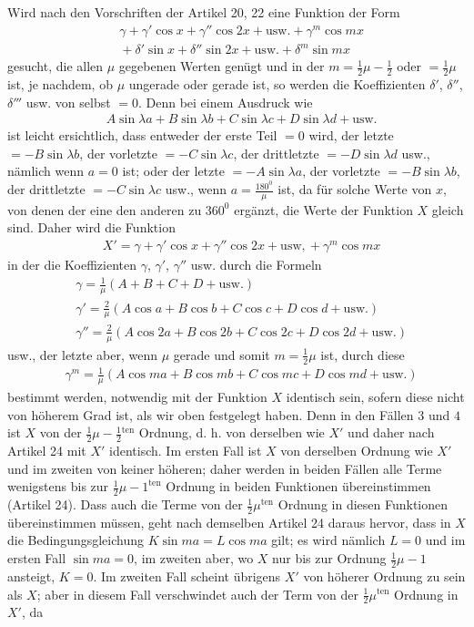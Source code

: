 Wird nach den Vorschriften der Artikel 20, 22 eine Funktion der Form
\[
\begin{aligned}
&\gamma+\gamma'\cos x+\gamma''\cos2x+\mathrm{usw.}+\gamma^m\cos mx\\[5pt]
&{}+\delta'\sin x+\delta''\sin2x+\mathrm{usw.}+\delta^m\sin mx
\end{aligned}
\]
gesucht, die allen $\mu$ gegebenen Werten genügt und in der $m=\frac12\mu-\frac12$ oder $=\frac12\mu$ ist, je nachdem, ob $\mu$ ungerade oder gerade ist, so werden die Koeffizienten $\delta'$, $\delta''$, $\delta'''$ usw. von selbst $=0$. Denn bei einem Ausdruck wie
\[
\begin{aligned}
&A\sin\lambda a+B\sin\lambda b+C\sin\lambda c+D\sin\lambda d+\mathrm{usw.}
\end{aligned}
\]
ist leicht ersichtlich, dass entweder der erste Teil $=0$ wird, der letzte $=-B\sin\lambda b$, der vorletzte $=-C\sin\lambda c$, der drittletzte $=-D\sin\lambda d$ usw., nämlich wenn $a=0$ ist; oder der letzte $=-A\sin\lambda a$, der vorletzte $=-B\sin\lambda b$, der drittletzte $=-C\sin\lambda c$ usw., wenn $a=\frac{180^{\mathord{0}}}{\mu}$ ist, da für solche Werte von $x$, von denen der eine den anderen zu $360^{\mathord{0}}$ ergänzt, die Werte der Funktion $X$ gleich sind. 
Daher wird die Funktion
\[
\begin{aligned}
&X'=\gamma+\gamma'\cos x+\gamma''\cos2x+\mathrm{usw,}+\gamma^m\cos mx
\end{aligned}
\]
in der die Koeffizienten $\gamma$, $\gamma'$, $\gamma''$ usw. durch die Formeln
\[
\begin{aligned}
&\gamma = \frac{1}{\mu}(A+B+C+D+\mathrm{usw.})\\[5pt]
&\gamma' = \frac{2}{\mu}(A\cos a+B\cos b+C\cos c+D\cos d+\mathrm{usw.})\\[5pt]
&\gamma'' = \frac{2}{\mu}(A\cos 2a+B\cos 2b+C\cos 2c+D\cos 2d+\mathrm{usw.})
\end{aligned}
\]
usw., der letzte aber, wenn $\mu$ gerade und somit $m=\frac12\mu$ ist, durch diese
\[
\begin{aligned}
&\gamma^m=\frac{1}{\mu}(A\cos ma+B\cos mb+C\cos mc+D\cos md+\mathrm{usw.})
\end{aligned}
\]
bestimmt werden, notwendig mit der Funktion $X$ identisch sein, sofern diese nicht von höherem Grad ist, als wir oben festgelegt haben. Denn in den Fällen $3$ und $4$ ist $X$ von der $\frac12\mu-\frac12{}^{\mathrm{ten}}$ Ordnung, d. h. von derselben wie $X'$ und daher nach Artikel 24 mit $X'$ identisch. Im ersten Fall ist $X$ von derselben Ordnung wie $X'$ und im zweiten von keiner höheren; daher werden in beiden Fällen alle Terme wenigstens bis zur $\frac12\mu-1^{\mathrm{ten}}$ Ordnung in beiden Funktionen übereinstimmen (Artikel 24). Dass auch die Terme von der $\frac12\mu^{\mathrm{ten}}$ Ordnung in diesen Funktionen übereinstimmen müssen, geht nach demselben Artikel 24 daraus hervor, dass in $X$ die Bedingungsgleichung $K\sin ma=L\cos ma$ gilt; es wird nämlich $L=0$ und im ersten Fall $\sin ma=0$, im zweiten aber, wo $X$ nur bis zur Ordnung $\frac12\mu-1$ ansteigt, $K=0$. Im zweiten Fall scheint übrigens $X'$ von höherer Ordnung zu sein als $X$; aber in diesem Fall verschwindet auch der Term von der $\frac12\mu^{\mathrm{ten}}$ Ordnung in $X'$, da

